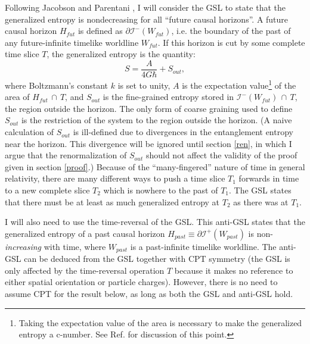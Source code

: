 \documentclass[11pt]{article}
\begin{document}
Following Jacobson and Parentani \cite{JP03}, I will consider the GSL to state that the generalized entropy is nondecreasing for all ``future causal horizons''.  A future causal horizon $H_{fut}$ is defined as $\partial \mathcal{I}^-(W_{fut})$, i.e. the boundary of the past of any future-infinite timelike worldline $W_{fut}$.  If this horizon is cut by some complete time slice $T$, the generalized entropy is the quantity:
\begin{equation}\label{gen}
S = \frac{A}{4G\hbar} + S_{out},
\end{equation}
where Boltzmann's constant $k$ is set to unity, $A$ is the expectation value\footnote{Taking the expectation value of the area is necessary to make the generalized entropy a c-number.  See Ref. \cite{10proofs} for discussion of this point.} of the area of $H_{fut}\,\cap\,T$, and $S_{out}$ is the fine-grained entropy stored in $\mathcal{I}^-(W_{fut})\,\cap\,T$, the region outside the horizon.  The only form of coarse graining used to define $S_{out}$ is the restriction of the system to the region outside the horizon.  (A naive calculation of $S_{out}$ is ill-defined due to divergences in the entanglement entropy near the horizon.  This divergence will be ignored until section \ref{ren}, in which I argue that the renormalization of $S_{out}$ should not affect the validity of the proof given in section \ref{proof}.)  Because of the ``many-fingered'' nature of time in general relativity, there are many different ways to push a time slice $T_1$ forwards in time to a new complete slice $T_2$ which is nowhere to the past of $T_1$.  The GSL states that there must be at least as much generalized entropy at $T_2$ as there was at $T_1$.

I will also need to use the time-reversal of the GSL.  This anti-GSL states that the generalized entropy of a past causal horizon $H_{past} \equiv \partial \mathcal{I}^+(W_{past})$ is non-\emph{increasing} with time, where $W_{past}$ is a past-infinite timelike worldline.  The anti-GSL can be deduced from the GSL together with CPT symmetry (the GSL is only affected by the time-reversal operation $T$ because it makes no reference to either spatial orientation or particle charges).  However, there is no need to assume CPT for the result below, as long as both the GSL and anti-GSL hold.
\end{document}
